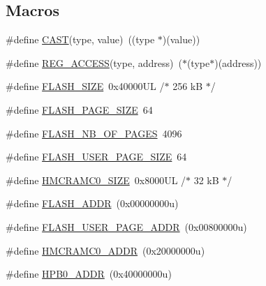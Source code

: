 \subsection*{Macros}
\begin{DoxyCompactItemize}
\item 
\#define \mbox{\hyperlink{group___s_a_m_d21_g18_a_u__definitions_ga015dfee129875688293180ddef474138}{C\+A\+ST}}(type,  value)~((type $\ast$)(value))
\item 
\#define \mbox{\hyperlink{group___s_a_m_d21_g18_a_u__definitions_gad9dd6ceb323c1d2d3caf66d30ea9a47b}{R\+E\+G\+\_\+\+A\+C\+C\+E\+SS}}(type,  address)~($\ast$(type$\ast$)(address))
\item 
\#define \mbox{\hyperlink{group___s_a_m_d21_g18_a_u__definitions_gae69620948dea1b76e0ab7843ab719db7}{F\+L\+A\+S\+H\+\_\+\+S\+I\+ZE}}~0x40000\+U\+L /$\ast$ 256 k\+B $\ast$/
\item 
\#define \mbox{\hyperlink{group___s_a_m_d21_g18_a_u__definitions_ga4cc14e2c99ae7f8e5a8e371d03c8532c}{F\+L\+A\+S\+H\+\_\+\+P\+A\+G\+E\+\_\+\+S\+I\+ZE}}~64
\item 
\#define \mbox{\hyperlink{group___s_a_m_d21_g18_a_u__definitions_ga264f8ab3607e09ec028c32cb7538fd91}{F\+L\+A\+S\+H\+\_\+\+N\+B\+\_\+\+O\+F\+\_\+\+P\+A\+G\+ES}}~4096
\item 
\#define \mbox{\hyperlink{group___s_a_m_d21_g18_a_u__definitions_ga595d6fe8572383d794338e55614a5a7f}{F\+L\+A\+S\+H\+\_\+\+U\+S\+E\+R\+\_\+\+P\+A\+G\+E\+\_\+\+S\+I\+ZE}}~64
\item 
\#define \mbox{\hyperlink{group___s_a_m_d21_g18_a_u__definitions_gaaf0b3acc28d2637a807c6c6c033a63a6}{H\+M\+C\+R\+A\+M\+C0\+\_\+\+S\+I\+ZE}}~0x8000\+U\+L /$\ast$ 32 k\+B $\ast$/
\item 
\#define \mbox{\hyperlink{group___s_a_m_d21_g18_a_u__definitions_ga485a21e55bcc66416a04d2fec83513fa}{F\+L\+A\+S\+H\+\_\+\+A\+D\+DR}}~(0x00000000u)
\item 
\#define \mbox{\hyperlink{group___s_a_m_d21_g18_a_u__definitions_ga263dc504b29b21d616514ac65000957e}{F\+L\+A\+S\+H\+\_\+\+U\+S\+E\+R\+\_\+\+P\+A\+G\+E\+\_\+\+A\+D\+DR}}~(0x00800000u)
\item 
\#define \mbox{\hyperlink{group___s_a_m_d21_g18_a_u__definitions_gab60016bed594251a4955f546002d126f}{H\+M\+C\+R\+A\+M\+C0\+\_\+\+A\+D\+DR}}~(0x20000000u)
\item 
\#define \mbox{\hyperlink{group___s_a_m_d21_g18_a_u__definitions_gaa3dc0741f009f571f4a45086601718f6}{H\+P\+B0\+\_\+\+A\+D\+DR}}~(0x40000000u)
\item 

\end{DoxyCompactItemize}
